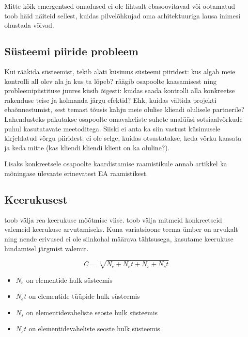 \documentclass{article}
\begin{document}
Mitte kõik emergentsed omadused ei ole lihtsalt ebasoovitavad või ootamatud \cite{emergence} toob häid näiteid sellest, kuidas pilvelõhkujad oma arhitektuuriga lausa inimesi ohustada võivad.

\subsection{Süsteemi piiride probleem}
\label{sec:boundary}
Kui rääkida süsteemist, tekib alati küsimus süsteemi piiridest: kus algab meie kontrolli all olev ala ja kus ta lõpeb? \cite{wood2013framework} räägib osapoolte kaasamisest ning probleemipüstituse juures küsib õigesti: kuidas saada kontrolli alla konkreetse rakenduse teise ja kolmanda järgu efektid? Ehk, kuidas vältida projekti ebaõnnestumist, sest temast tõusis kahju meie olulise kliendi olulisele partnerile? Lahendusteks pakutakse osapoolte omavaheliste suhete analüüsi sotsiaalvõrkude puhul kasutatavate meetoditega. Siiski ei anta ka siin vastust küsimusele kirjeldatud võrgu piiridest: ei ole selge, kuidas otsustatakse, keda võrku kaasata ja keda mitte (kas kliendi kliendi klient on ka oluline?). 

Lisaks konkreetsele osapoolte kaardistamise raamistikule annab artikkel ka mõningase ülevaate erinevatest EA raamistikest.

\subsection{Keerukusest}
\label{sec:complexity}
\cite{mitchell2009complexity} toob välja rea keerukuse mõõtmise viise. \citeauthor{crawley2015systems} \citep[p. 287]{crawley2015systems} toob välja mitmeid konkreetseid valemeid keerukuse arvutamiseks. Kuna variatsioone teema ümber on arvukalt ning nende erivused ei ole siinkohal määrava tähtsusega, kasutame keerukuse hindamisel järgmist valemit. 

\begin{equation}
	C = \sqrt[3]{N_e + N_et + N_s + N_st}
	\label{eq:complexity}
\end{equation}

\begin{itemize}
	\item $N_e$ on elementide hulk süsteemis
	\item $N_et$ on elementide tüüpide hulk süsteemis
	\item $N_s$ on elementidevaheliste seoste hulk süsteemis
	\item $N_st$ on elementidevaheliste seoste hulk süsteemis
\end{itemize}
\end{document}
